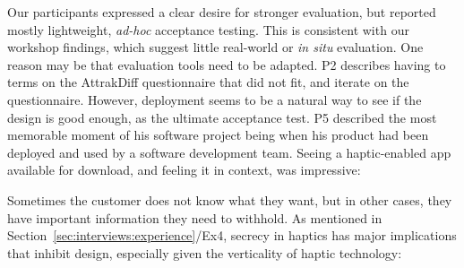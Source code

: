Our participants expressed a clear desire for stronger evaluation, but reported %
mostly lightweight, \emph{ad-hoc} acceptance testing. 
This is consistent with our workshop findings, which suggest little real-world or \emph{in situ} evaluation. 
One reason may be that evaluation tools need to be adapted. P2 describes having to  terms on the AttrakDiff questionnaire that did not fit, and iterate on the questionnaire.
However, deployment seems to be a natural way to see if the design is good enough, as the ultimate acceptance test.
P5 described the most memorable moment of his software project being when his product had been deployed and used by a software development team.
Seeing a haptic-enabled app available for download, and feeling it in context, was impressive:

\begin{quote}
\end{quote}



\label{sec:interviews:culture:secrecy}
Sometimes the customer does not know what they want, but in other cases, they have important information they need to withhold.
As mentioned in Section~\ref{sec:interviews:experience}/Ex4, secrecy in haptics has major implications that inhibit design, especially given the verticality of haptic technology:

\begin{quote}
\end{quote}

